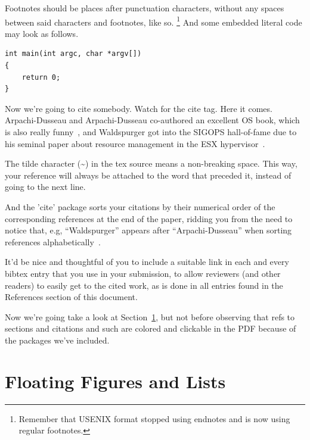 Footnotes should be places after punctuation characters, without any
spaces between said characters and footnotes, like so.%
\footnote{Remember that USENIX format stopped using endnotes and is
  now using regular footnotes.} And some embedded literal code may
look as follows.

\begin{verbatim}
int main(int argc, char *argv[]) 
{
    return 0;
}
\end{verbatim}

Now we're going to cite somebody. Watch for the cite tag. Here it
comes. Arpachi-Dusseau and Arpachi-Dusseau co-authored an excellent OS
book, which is also really funny~\cite{arpachiDusseau18:osbook}, and
Waldspurger got into the SIGOPS hall-of-fame due to his seminal paper
about resource management in the ESX hypervisor~\cite{waldspurger02}.

The tilde character (\~{}) in the tex source means a non-breaking
space. This way, your reference will always be attached to the word
that preceded it, instead of going to the next line.

And the 'cite' package sorts your citations by their numerical order
of the corresponding references at the end of the paper, ridding you
from the need to notice that, e.g, ``Waldspurger'' appears after
``Arpachi-Dusseau'' when sorting references
alphabetically~\cite{waldspurger02,arpachiDusseau18:osbook}. 

It'd be nice and thoughtful of you to include a suitable link in each
and every bibtex entry that you use in your submission, to allow
reviewers (and other readers) to easily get to the cited work, as is
done in all entries found in the References section of this document.

Now we're going take a look at Section~\ref{sec:figs}, but not before
observing that refs to sections and citations and such are colored and
clickable in the PDF because of the packages we've included.

\section{Floating Figures and Lists}
\label{sec:figs}


